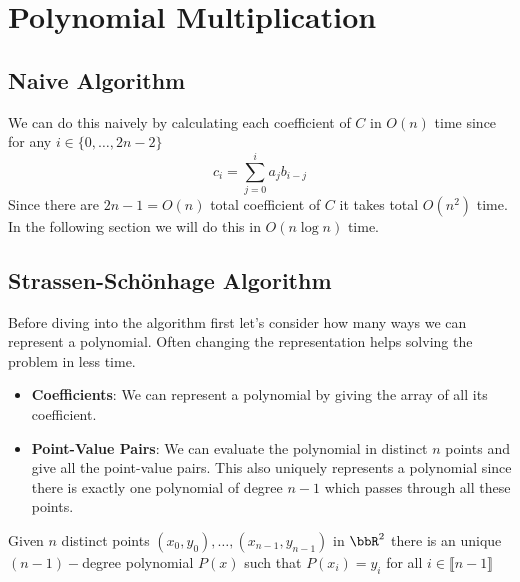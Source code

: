 \chapter{Polynomial Multiplication}
\begin{algoprob}
\end{algoprob}
\section{Naive Algorithm}
We can do this naively by calculating each coefficient of $C$ in $O(n)$ time since for any $i\in\{0,\dots, 2n-2\}$ $$c_i=\sum_{j=0}^ia_jb_{i-j}$$Since there are $2n-1=O(n)$ total coefficient of $C$ it takes total $O(n^2)$ time. In the following section we will do this in $O(n\log n)$ time.
\section{Strassen-Sch\"{o}nhage Algorithm}
Before diving into the algorithm first let's consider how many ways we can represent a polynomial. Often changing the representation helps solving the problem in less time.\begin{itemize}
	\item \textbf{Coefficients}: We can represent a polynomial by giving the array of all its coefficient.
	\item \textbf{Point-Value Pairs}: We can evaluate the polynomial in distinct $n$ points and give all the point-value pairs. This also uniquely represents a polynomial since there is exactly one polynomial of degree $n-1$ which passes through all these points. 
\end{itemize}
\begin{Theorem}{}{}
	Given $n$ distinct points $(x_0,y_0),\dots, (x_{n-1},y_{n-1})$ in $\bbR^2$ there is an unique $(n-1)-$degree polynomial $P(x)$ such that $P(x_i)=y_i$ for all $i\in \llbracket n-1\rrbracket$
\end{Theorem}
\parinn

